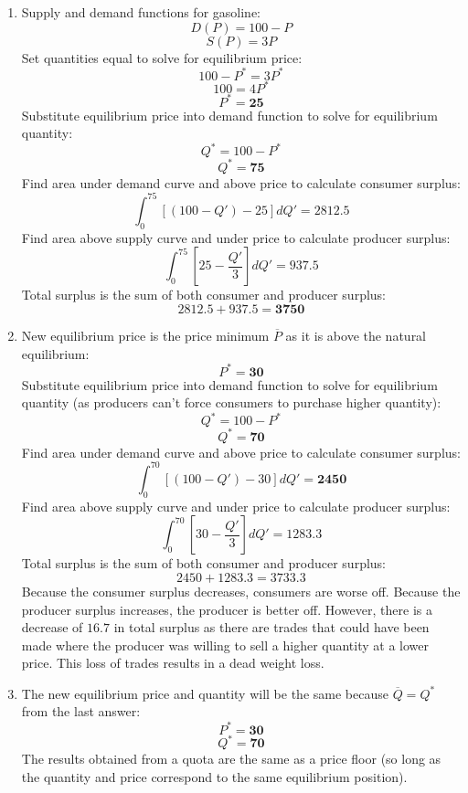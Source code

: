 \documentclass{article}
\begin{document}
\begin{enumerate}

    \item Supply and demand functions for gasoline:
        \[D(P)=100-P\]
        \[S(P)=3P\]
        Set quantities equal to solve for equilibrium price:
        \[100-P^{*}=3P^{*}\]
        \[100=4P^{*}\]
        \[P^{*}=\mathbf{25}\]
        Substitute equilibrium price into demand function to solve for
        equilibrium quantity:
        \[Q^{*}=100-P^{*}\]
        \[Q^{*}=\mathbf{75}\]
        Find area under demand curve and above price to calculate consumer
        surplus:
        \[\int_{0}^{75} \left[(100-Q')-25\right] dQ'=\mathbf{2812.5}\]
        Find area above supply curve and under price to calculate producer
        surplus:
        \[\int_{0}^{75} \left[25-\frac{Q'}{3}\right] dQ'=\mathbf{937.5}\]
        Total surplus is the sum of both consumer and producer surplus:
        \[2812.5+937.5=\mathbf{3750}\]
    
    \item New equilibrium price is the price minimum \(\overline{P}\) as it is
        above the natural equilibrium:
        \[P^{*}=\mathbf{30}\]
        Substitute equilibrium price into demand function to solve for
        equilibrium quantity (as producers can't force consumers to purchase
        higher quantity):
        \[Q^{*}=100-P^{*}\]
        \[Q^{*}=\mathbf{70}\]
        Find area under demand curve and above price to calculate consumer
        surplus:
        \[\int_{0}^{70} \left[(100-Q')-30\right] dQ'=\mathbf{2450}\]
        Find area above supply curve and under price to calculate producer
        surplus:
        \[\int_{0}^{70} \left[30-\frac{Q'}{3}\right] dQ'=\mathbf{1283.3}\]
        Total surplus is the sum of both consumer and producer surplus:
        \[2450+1283.3=\mathbf{3733.3}\]
        Because the consumer surplus decreases, consumers are worse off. Because
        the producer surplus increases, the producer is better off. However,
        there is a decrease of \(16.7\) in total surplus as there are trades
        that could have been made where the producer was willing to sell a
        higher quantity at a lower price. This loss of trades results in a dead
        weight loss.
        
    \item The new equilibrium price and quantity will be the same because
         \(\overline{Q}=Q^{*}\) from the last answer:
        \[P^{*}=\mathbf{30}\]
        \[Q^{*}=\mathbf{70}\]
        The results obtained from a quota are the same as a price floor (so long
        as the quantity and price correspond to the same equilibrium position).
        

\end{enumerate}
\end{document}
